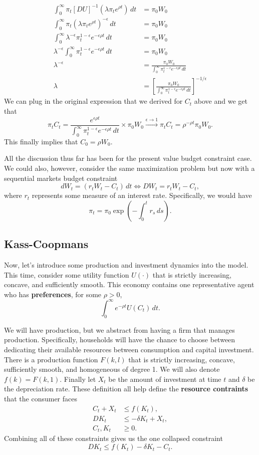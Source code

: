 \documentclass[11pt,english]{article}
\begin{document}
\begin{align*}
\int_0^\infty \pi_t[DU]^{-1}\left(\lambda\pi_te^{\rho t}\right)\,dt &= \pi_0W_0\\
\int_0^\infty \pi_t\left(\lambda\pi_te^{\rho t}\right)^{-\epsilon}\,dt &= \pi_0W_0\\
\int_0^\infty \lambda^{-\epsilon}\pi_t^{1-\epsilon}e^{-\epsilon\rho t}\,dt &= \pi_0W_0\\
\lambda^{-\epsilon}\int_0^\infty \pi_t^{1-\epsilon}e^{-\epsilon\rho t}\,dt &= \pi_0W_0\\
\lambda^{-\epsilon} &= \frac{\pi_0W_0}{\int_0^\infty \pi_t^{1-\epsilon}e^{-\epsilon\rho t}\,dt}\\
\lambda &= \left[\frac{\pi_0W_0}{\int_0^\infty \pi_t^{1-\epsilon}e^{-\epsilon\rho t}\,dt}\right]^{-1/\epsilon}
\end{align*}
We can plug in the original expression that we derived for $C_t$ above and we get that $$\pi_t C_t = \frac{e^{\epsilon \rho t}}{\int_0^\infty \pi_t^{1-\epsilon}e^{-\epsilon\rho t}\,dt}\times \pi_0 W_0 \xrightarrow{\epsilon \to 1} \pi_t C_t = \rho ^{-\rho t} \pi_0W_0.$$ This finally implies that $C_0 = \rho W_0$.

All the discussion thus far has been for the present value budget constraint case. We could also, however, consider the same maximization problem but now with a sequential markets budget constraint $$dW_t = (r_tW_t - C_t)\,dt \Longleftrightarrow DW_t = r_tW_t - C_t,$$ where $r_t$ represents some measure of an interest rate. Specifically, we would have $$\pi_t = \pi_0\exp\left(-\int_0^tr_s\,ds\right).$$

\subsection{Kass-Coopmans}
Now, let's introduce some production and investment dynamics into the model. This time, consider some utility function $U(\cdot)$ that is strictly increasing, concave, and sufficiently smooth. This economy contains one representative agent who has \textbf{preferences}, for some $\rho > 0$, $$\int_0^\infty e^{-\rho t} U(C_t)\,dt.$$

We will have production, but we abstract from having a firm that manages production. Specifically, households will have the chance to choose between dedicating their available resources between consumption and capital investment. There is a production function $F(k, l)$ that is strictly increasing, concave, sufficiently smooth, and homogeneous of degree 1. We will also denote $f(k) = F(k,1)$. Finally let $X_t$ be the amount of investment at time $t$ and $\delta$ be the depreciation rate. These definition all help define the \textbf{resource contraints} that the consumer faces
\begin{align*}
C_t + X_t &\leq f(K_t),\\
DK_t &\leq - \delta K_t + X_t,\\
C_t, K_t &\geq 0.
\end{align*}Combining all of these constraints gives us the one collapsed constraint $$DK_t \leq f(K_t) -\delta K_t - C_t.$$
\end{document}
